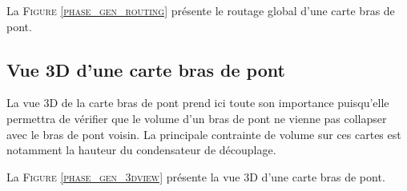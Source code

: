 		La \textsc{Figure \ref{phase_gen_routing}} présente le routage
		global d'une carte bras de pont.		
		
		\subsection{Vue 3D d'une carte bras de pont}

		La vue 3D de la carte bras de pont prend ici toute son
		importance puisqu'elle permettra de vérifier que le
		volume d'un bras de pont ne vienne pas collapser avec
		le bras de pont voisin. La principale contrainte
		de volume sur ces cartes est notamment la hauteur du
		condensateur de découplage.
		
		La \textsc{Figure \ref{phase_gen_3dview}} présente la vue
		3D d'une carte bras de pont.

		\newpage
		
